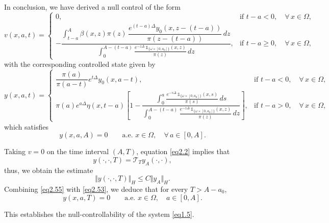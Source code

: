 \documentclass[10pt, a4]{amsart}
\makeatletter
\theoremstyle{plain}
\theoremstyle{definition}
\theoremstyle{remark}
\renewenvironment{proof}[1][\proofname]{\par
  \pushQED{\qed}%
  \normalfont \topsep6\p@\@plus6\p@\relax
  \trivlist
  \item[\hskip\labelsep
        \itshape
    #1\ \ref{#1}.]\ignorespaces
}{%
  \popQED\endtrivlist\@endpefalse
}
\numberwithin{equation}{section}
\makeatother
\begin{document}
\begin{proof}[of Proposition \ref{th1.3}]
In conclusion, we have derived a null control of the form
\begin{equation}\label{eq2.51}
v(x,a,t)=\begin{cases}
0, & \text{if } t-a<0,\quad \forall\, x\in\Omega,\\[1mm]
-\dfrac{\displaystyle\int_{t-a}^{A}\beta(x,z)\pi(z)\,\dfrac{e^{(t-a)\Delta}y_0(x,z-(t-a))}{\pi(z-(t-a))}\,dz}{\displaystyle\int_{0}^{A-(t-a)}\frac{e^{-z\Delta}\,\mathds{1}_{\{\omega\times[0,a_0]\}}(x,z)}{\pi(z)}\,dz}, & \text{if } t-a\geq 0,\quad \forall\, x\in\Omega,
\end{cases}
\end{equation}
with the corresponding controlled state given by
\begin{equation}\label{eq2.52}
y(x,a,t)=\begin{cases}
\dfrac{\pi(a)}{\pi(a-t)}e^{t\Delta}y_0(x,a-t), & \text{if } t-a<0,\quad \forall\, x\in\Omega,\\[1mm]
\pi(a)e^{a\Delta}\eta(x,t-a)\left[1-\dfrac{\displaystyle\int_{0}^{a}\frac{e^{-s\Delta}\,\mathds{1}_{\{\omega\times[0,a_0]\}}(x,s)}{\pi(s)}\,ds}{\displaystyle\int_{0}^{A-(t-a)}\frac{e^{-z\Delta}\,\mathds{1}_{\{\omega\times[0,a_0]\}}(x,z)}{\pi(z)}\,dz}\right], & \text{if } t-a>0,\quad \forall\, x\in\Omega,
\end{cases}
\end{equation}
which satisfies
\begin{equation}\label{eq2.53}
y(x,a,A)=0\qquad \text{a.e. } x\in\Omega,\quad \forall\, a\in [0,A].
\end{equation}

Taking \(v=0\) on the time interval \((A,T)\), equation \eqref{eq2.2} implies that
\[
y(\cdot,\cdot,T)=\mathcal{T}_T y_A(\cdot,\cdot),
\]
thus, we obtain the estimate
\begin{equation}\label{eq2.55}
\Vert y(\cdot,\cdot,T)\Vert_{H}\leq C \Vert y_A\Vert_{H}.
\end{equation}
Combining \eqref{eq2.55} with \eqref{eq2.53}, we deduce that for every \(T > A-a_0\),
\begin{equation}\label{eq2.56}
y(x,a,T)=0\qquad \text{a.e. } x\in\Omega,\quad  a\in [0,A].
\end{equation}

This establishes the null-controllability of the system \eqref{eq1.5}.
\end{proof}
\end{document}
